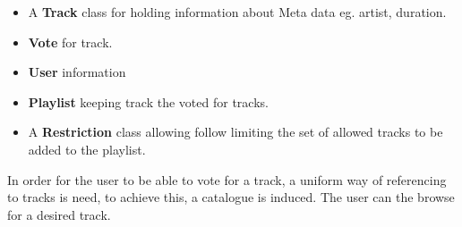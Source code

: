 \begin{itemize}
\item A \textbf{Track} class for holding information about Meta data eg. artist, duration.
\item \textbf{Vote} for track.
\item \textbf{User} information
\item \textbf{Playlist} keeping track the voted for tracks.
\item A \textbf{Restriction} class allowing follow limiting the set of allowed tracks to be added to the playlist.
\end{itemize}

In order for the user to be able to vote for a track, a uniform way of referencing to tracks is need, to achieve this, a catalogue is induced. The user can the browse for a desired track.